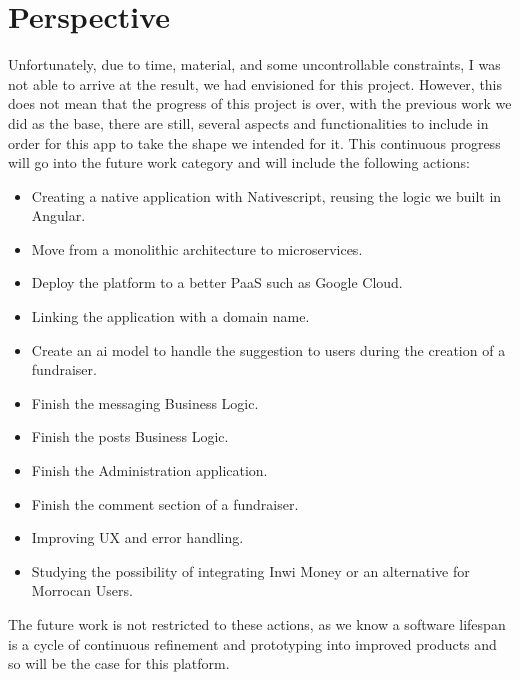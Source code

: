 \section*{Perspective}
Unfortunately, due to time, material, and some uncontrollable constraints, I was not able to arrive 
at the result, we had envisioned
for this project. However, this does not mean that the progress of this project is over, with the
previous work we did as the base, there are
still, several aspects and functionalities to include in order for this app to take the shape we
intended for it. This continuous progress will go into the future work category and will include
the following actions:
\begin{itemize}
    \item Creating a native application with Nativescript, reusing the logic we built in Angular.
    \item Move from a monolithic architecture to microservices.
    \item Deploy the platform to a better PaaS such as Google Cloud.
    \item Linking the application with a domain name.
    \item Create an ai model to handle the suggestion to users during the creation of a fundraiser.
    \item Finish the messaging Business Logic.
    \item Finish the posts Business Logic.
    \item Finish the Administration application.
    \item Finish the comment section of a fundraiser.
    \item Improving UX and error handling.
    \item Studying the possibility of integrating Inwi Money or an alternative for Morrocan Users.
\end{itemize}

The future work is not restricted to these actions, as we know a software lifespan is a
cycle of continuous refinement and prototyping into improved products and so will be the case
for this platform.
